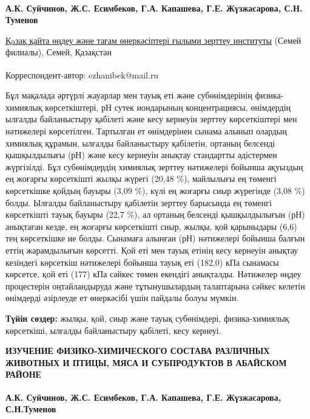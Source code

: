 
\begin{articleheader}

{\bfseries
А.К. Суйчинов,
Ж.С. Есимбеков\textsuperscript{\envelope },
Г.А. Капашева,
Г.Е. Жүзжасарова,
С.Н. Туменов
}
\end{articleheader}

\begin{affiliation}
\href{https://rpf.kz/?lang=kk}{Қaзақ қайта өңдеу және тағам өнеркәсіптері ғылыми зерттеу институты} (Семей филиалы), Семей, Қазақстан

\raggedright \textsuperscript{\envelope }Корреспондент-автор: ezhanibek@mail.ru
\end{affiliation}

Бұл мақалада әртүрлі жауарлар мен тауық еті және субөнімдерінің
физика-химиялық көрсеткіштері, рН сутек иондарының концентрациясы,
өнімдердің ылғалды байланыстыру қабілеті және кесу кернеуін зерттеу
көрсеткіштері мен нәтижелері көрсетілген. Тартылған ет өнімдерінен
сынама алынып олардың химиялық құрамын, ылғалды байланыстыру қабілетін,
ортаның белсенді қышқылдылығы (рН) және кесу кернеуін анықтау стандартты
әдістермен жүргізілді. Бұл субөнімдердің химиялық зерттеу нәтижелері
бойынша ақуыздың ең жоғарғы көрсеткішті жылқы жүрегі (20,48 \%),
майлылығы ең төменгі көрсеткішке қойдың бауыры (3,09 \%), күлі ең
жоғарғы сиыр жүрегінде (3,08 \%) болды. Ылғалды байланыстыру қабілетін
зерттеу барысында ең төменгі көрсеткішті тауық бауыры (22,7 \%), ал
ортаның белсенді қышқылдылығын (рН) анықтаған кезде, ең жоғарғы
көрсеткішті сиыр, жылқы, қой қарыныдары (6,6) тең көрсеткішке ие болды.
Сынамаға алынған (рН) нәтижелері бойынша балғын еттің жарамдылығын
көрсетті. Қой еті мен тауық етінің кесу кернеуін анықтау кезіндегі
көрсеткіш нәтижелері бойынша тауық еті (182,0) кПа сынамасы көрсетсе,
қой еті (177) кПа сәйкес төмен екендігі анықталды. Нәтижелер өңдеу
процестерін оңтайландыруда және тұтынушылардың талаптарына сәйкес
келетін өнімдерді әзірлеуде ет өнеркәсібі үшін пайдалы болуы мүмкін.

{\bfseries Түйін сөздер:} жылқы, қой, сиыр және тауық субөнімдері,
физика-химиялық көрсеткіші, ылғалды байланыстыру қабілеті, кесу кернеуі.

\begin{articleheader}
{\bfseries ИЗУЧЕНИЕ ФИЗИКО-ХИМИЧЕСКОГО СОСТАВА РАЗЛИЧНЫХ ЖИВОТНЫХ И ПТИЦЫ,
МЯСА И СУБПРОДУКТОВ В АБАЙСКОМ РАЙОНЕ}

{\bfseries
А.К. Суйчинов,
Ж.С. Есимбеков\textsuperscript{\envelope },
Г.А. Капашева,
Г.Е. Жүзжасарова,
С.Н.Туменов
}
\end{articleheader}

